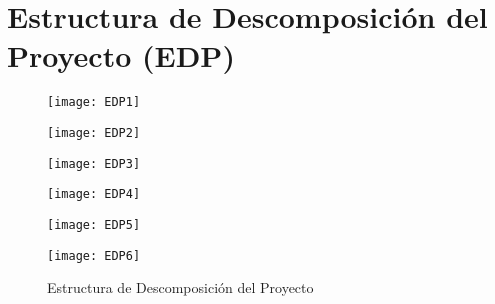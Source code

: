 
\chapter{Estructura de Descomposición del Proyecto (EDP)}\label{edp}


\vspace{2cm}
\begin{figure}[h]
  \centering\texttt{[image: EDP1]}\\
  \label{fg:EDP}
\end{figure}

\begin{figure}[h]
  \centering\texttt{[image: EDP2]}\\
  \label{fg:EDP}
\end{figure}

\begin{figure}[h]
  \centering\texttt{[image: EDP3]}\\
  \label{fg:EDP}
\end{figure}

\begin{figure}[h]
  \centering\texttt{[image: EDP4]}\\
  \label{fg:EDP}
\end{figure}

\begin{figure}[h]
  \centering\texttt{[image: EDP5]}\\
  \label{fg:EDP}
\end{figure}

\begin{figure}[h]
  \centering\texttt{[image: EDP6]}\\
  \caption{Estructura de Descomposición del Proyecto}\label{fg:EDP}
\end{figure}